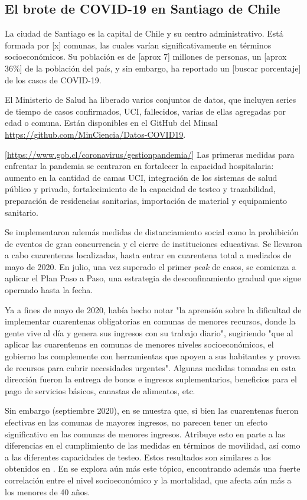 \subsection{El brote de COVID-19 en Santiago de Chile }

La ciudad de Santiago es la capital de Chile y su centro administrativo. Está formada por [x] comunas, las cuales varían significativamente en términos socioeconómicos. Su población es de [aprox 7] millones de personas, un [aprox 36\%] de la población del país, y sin embargo, ha reportado un [buscar porcentaje] de los casos de COVID-19.

El Ministerio de Salud ha liberado varios conjuntos de datos, que incluyen series de tiempo de casos confirmados, UCI, fallecidos, varias de ellas agregadas por edad o comuna. Están disponibles en el GitHub del Minsal \url{https://github.com/MinCiencia/Datos-COVID19}.



[\url{https://www.gob.cl/coronavirus/gestionpandemia/}]
Las primeras medidas para enfrentar la pandemia se centraron en fortalecer la capacidad hospitalaria: aumento en la cantidad de camas UCI, integración de los sistemas de salud público y privado, fortalecimiento de la capacidad de testeo y trazabilidad, preparación de residencias sanitarias, importación de material y equipamiento sanitario.

Se implementaron además medidas de distanciamiento social como la prohibición de eventos de gran concurrencia y el cierre de instituciones educativas. Se llevaron a cabo cuarentenas localizadas, hasta entrar en cuarentena total a mediados de mayo de 2020. En julio, una vez superado el primer \textit{peak} de casos, se comienza a aplicar el Plan Paso a Paso, una estrategia de desconfinamiento  gradual que sigue operando hasta la fecha.

Ya a fines de mayo de 2020, \cite{Olivares2020} había hecho notar "la aprensión sobre la dificultad de implementar cuarentenas obligatorias en comunas de menores recursos, donde la gente vive al día y genera sus ingresos con su trabajo diario", sugiriendo "que al aplicar las cuarentenas en comunas de menores niveles socioeconómicos, el gobierno las complemente con herramientas que apoyen a sus habitantes y provea de recursos para cubrir necesidades urgentes". Algunas medidas tomadas en esta dirección fueron la entrega de bonos e ingresos suplementarios, beneficios para el pago de servicios básicos, canastas de alimentos, etc.

Sin embargo (septiembre 2020), en \cite{Bennett2021} se muestra que, si bien las cuarentenas fueron efectivas en las comunas de mayores ingresos, no parecen tener un efecto significativo en las comunas de menores ingresos. Atribuye esto en parte a las diferencias en el cumplimiento de las medidas en términos de movilidad, así como a las diferentes capacidades de testeo. Estos resultados son similares a los obtenidos en \cite{Gozzi2021}. En \cite{Mena2021} se explora aún más este tópico, encontrando además una fuerte correlación entre el nivel socioeconómico y la mortalidad, que afecta aún más a los menores de 40 años.

